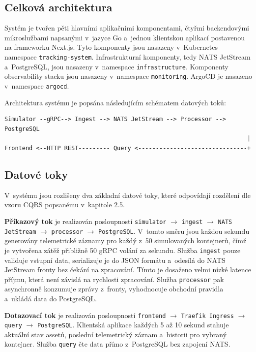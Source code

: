 \documentclass[11pt, a4paper, oneside]{article}
\begin{document}
\subsection{Celková architektura}

Systém je tvořen pěti hlavními aplikačními komponentami, čtyřmi backendovými mikroslužbami napsanými v~jazyce Go a~jednou klientskou aplikací postavenou na frameworku Next.js. Tyto komponenty jsou nasazeny v~Kubernetes namespace \texttt{tracking-system}. Infrastrukturní komponenty, tedy NATS JetStream a~PostgreSQL, jsou nasazeny v~namespace \texttt{infrastructure}. Komponenty observability stacku jsou nasazeny v~namespace \texttt{monitoring}. ArgoCD je nasazeno v~namespace \texttt{argocd}.

Architektura systému je popsána následujícím schématem datových toků:

\begin{verbatim}
Simulator --gRPC--> Ingest --> NATS JetStream --> Processor --> PostgreSQL
                                                                     |
Frontend <--HTTP REST--------- Query <-------------------------------+
\end{verbatim}

\subsection{Datové toky}

V~systému jsou rozlišeny dva základní datové toky, které odpovídají rozdělení dle vzoru CQRS popsanému v~kapitole 2.5.

\textbf{Příkazový tok} je realizován posloupností \texttt{simulator} $\rightarrow$ \texttt{ingest} $\rightarrow$ \texttt{NATS Jet\-Stream} $\rightarrow$ \texttt{processor} $\rightarrow$ \texttt{PostgreSQL}. V~tomto směru jsou každou sekundu generovány telemetrické záznamy pro každý z~50 simulovaných kontejnerů, čímž je vytvořena zátěž přibližně 50 gRPC volání za sekundu. Služba \texttt{ingest} pouze validuje vstupní data, serializuje je do JSON formátu a~odesílá do NATS JetStream fronty bez čekání na zpracování. Tímto je dosaženo velmi nízké latence příjmu, která není závislá na rychlosti zpracování. Služba \texttt{processor} pak asynchronně konzumuje zprávy z~fronty, vyhodnocuje obchodní pravidla a~ukládá data do PostgreSQL.

\textbf{Dotazovací tok} je realizován posloupností \texttt{frontend} $\rightarrow$ \texttt{Traefik Ingress} $\rightarrow$ \texttt{query} $\rightarrow$ \texttt{PostgreSQL}. Klientská aplikace každých 5 až 10 sekund stahuje aktuální stav assetů, poslední telemetrický záznam a~historii pro vybraný kontejner. Služba \texttt{query} čte data přímo z~PostgreSQL bez zapojení NATS.
\end{document}
